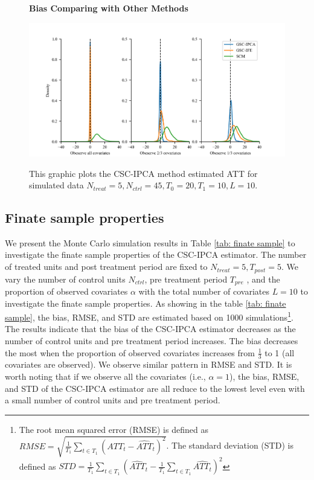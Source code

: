 \documentclass[12pt]{article}
\begin{document}
\begin{figure}[!ht]
\centering
\caption{\textbf{Bias Comparing with Other Methods}}
\includegraphics{figs/bias_compar1.png}
\label{fig: bias}
\caption*{\footnotesize{This graphic plots the CSC-IPCA method estimated ATT for simulated data $N_{treat} = 5, N_{ctrl} = 45, T_0=20, T_1=10, L=10$.}}
\end{figure}

\subsection{Finate sample properties}
We present the Monte Carlo simulation results in Table \ref{tab: finate sample} to investigate the finate sample properties of the CSC-IPCA estimator. The number of treated units and post treatment period are fixed to $N_{treat} = 5, T_{post}=5$. We vary the number of control units $N_{ctrl}$, pre treatment period $T_{pre}$ , and the proportion of observed covariates $\alpha$ with the total number of covariates $L=10$ to investigate the finate sample properties. As showing in the table \ref{tab: finate sample}, the bias, RMSE, and STD are estimated based on 1000 simulations\footnote{The root mean squared error (RMSE) is defined as $RMSE = \sqrt{\frac{1}{T_1}\sum_{t \in T_1}\left(ATT_t - \widehat{ATT}_t\right)^2}$. The standard deviation (STD) is defined as $STD = \frac{1}{T_1}\sum_{t \in T_1}\left(\widehat{ATT}_t - \frac{1}{T_1}\sum_{t \in T_1}\widehat{ATT_t}\right)^2$}. The results indicate that the bias of the CSC-IPCA estimator decreases as the number of control units and pre treatment period increases. The bias decreases the most when the proportion of observed covariates increases from $\frac{1}{3}$ to 1 (all covariates are observed). We observe similar pattern in RMSE and STD. It is worth noting that if we observe all the covariates (i.e., $\alpha = 1$), the bias, RMSE, and STD of the CSC-IPCA estimator are all reduce to the lowest level even with a small number of control units and pre treatment period.
\end{document}
